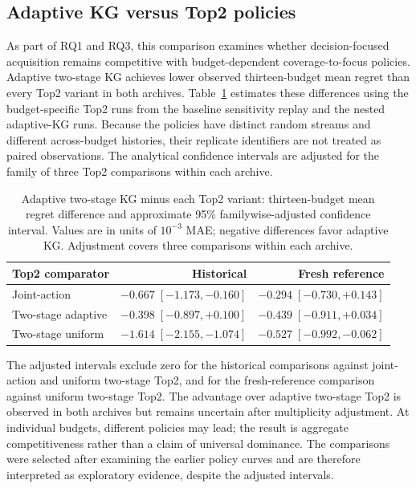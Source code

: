 \documentclass[10pt,a4paper]{article}
\begin{document}
\subsection{Adaptive KG versus Top2 policies}
As part of RQ1 and RQ3, this comparison examines whether decision-focused acquisition remains competitive with budget-dependent coverage-to-focus policies. Adaptive two-stage KG achieves lower observed thirteen-budget mean regret than every Top2 variant in both archives. Table~\ref{tab:top2-inference} estimates these differences using the budget-specific Top2 runs from the baseline sensitivity replay and the nested adaptive-KG runs. Because the policies have distinct random streams and different across-budget histories, their replicate identifiers are not treated as paired observations. The analytical confidence intervals are adjusted for the family of three Top2 comparisons within each archive.

\begin{table}[t]
\centering
\caption{Adaptive two-stage KG minus each Top2 variant: thirteen-budget mean regret difference and approximate 95\% familywise-adjusted confidence interval. Values are in units of $10^{-3}$ MAE; negative differences favor adaptive KG. Adjustment covers three comparisons within each archive.}
\label{tab:top2-inference}
\scriptsize
\begin{tabular}{lrr}
\toprule
Top2 comparator & Historical & Fresh reference\\
\midrule
Joint-action & $-0.667\;[-1.173,-0.160]$ & $-0.294\;[-0.730,+0.143]$\\
Two-stage adaptive & $-0.398\;[-0.897,+0.100]$ & $-0.439\;[-0.911,+0.034]$\\
Two-stage uniform & $-1.614\;[-2.155,-1.074]$ & $-0.527\;[-0.992,-0.062]$\\
\bottomrule
\end{tabular}
\end{table}

The adjusted intervals exclude zero for the historical comparisons against joint-action and uniform two-stage Top2, and for the fresh-reference comparison against uniform two-stage Top2. The advantage over adaptive two-stage Top2 is observed in both archives but remains uncertain after multiplicity adjustment. At individual budgets, different policies may lead; the result is aggregate competitiveness rather than a claim of universal dominance. The comparisons were selected after examining the earlier policy curves and are therefore interpreted as exploratory evidence, despite the adjusted intervals.
\end{document}
